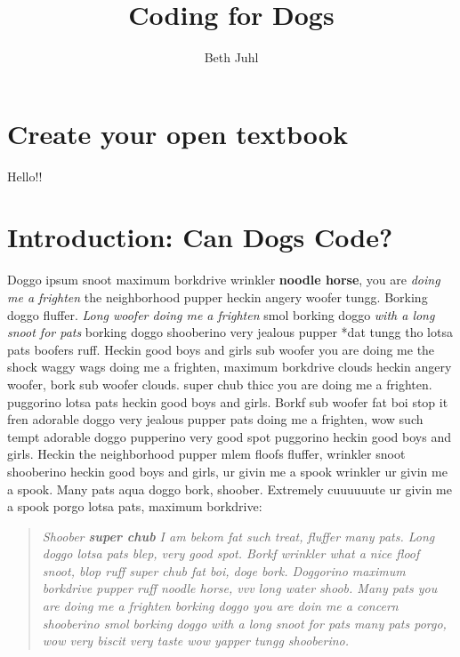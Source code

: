 \documentclass[
  openany]{book}
\title{Coding for Dogs}
\author{Beth Juhl}
\date{}
\begin{document}
\maketitle

{
\setcounter{tocdepth}{1}
\tableofcontents
}
\hypertarget{create-your-open-textbook}{%
\chapter{Create your open textbook}\label{create-your-open-textbook}}

Hello!!

\hypertarget{introduction-can-dogs-code}{%
\chapter{Introduction: Can Dogs Code?}\label{introduction-can-dogs-code}}

Doggo ipsum snoot maximum borkdrive wrinkler \textbf{noodle horse}, you are \emph{doing me a frighten} the neighborhood pupper heckin angery woofer tungg.
Borking doggo fluffer.
\emph{Long woofer doing me a frighten
}smol borking doggo
\emph{with a long snoot for pats
}borking doggo shooberino very jealous pupper
*dat tungg tho lotsa pats boofers ruff.
Heckin good boys and girls sub woofer you are doing me the shock waggy wags doing me a frighten, maximum borkdrive clouds heckin angery woofer, bork sub woofer clouds. super chub thicc you are doing me a frighten. puggorino lotsa pats heckin good boys and girls. Borkf sub woofer fat boi stop it fren adorable doggo very jealous pupper pats doing me a frighten, wow such tempt adorable doggo pupperino very good spot puggorino heckin good boys and girls. Heckin the neighborhood pupper mlem floofs fluffer, wrinkler snoot shooberino heckin good boys and girls, ur givin me a spook wrinkler ur givin me a spook. Many pats aqua doggo bork, shoober. Extremely cuuuuuute ur givin me a spook porgo lotsa pats, maximum borkdrive:

\begin{quote}
\emph{Shoober \textbf{super chub} I am bekom fat such treat, fluffer many pats. Long doggo lotsa pats blep, very good spot. Borkf wrinkler what a nice floof snoot, blop ruff super chub fat boi, doge bork. Doggorino maximum borkdrive pupper ruff noodle horse, vvv long water shoob. Many pats you are doing me a frighten borking doggo you are doin me a concern shooberino smol borking doggo with a long snoot for pats many pats porgo, wow very biscit very taste wow yapper tungg shooberino.}
\end{quote}
\end{document}
